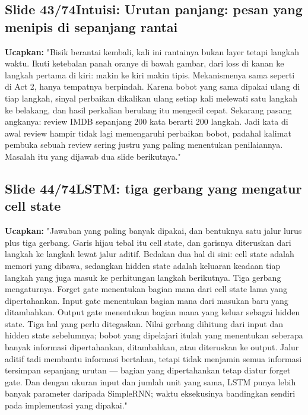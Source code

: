 \documentclass[11pt]{article}
\renewcommand{\framebox}[1]{\colorbox{acc!15}{\textcolor{acc}{\textbf{#1}}}}
\begin{document}
\subsection*{\framebox{Slide 43/74}\quad Intuisi: Urutan panjang: pesan yang menipis di sepanjang rantai}
\textbf{Ucapkan:} "Bisik berantai kembali, kali ini rantainya bukan layer tetapi langkah waktu. Ikuti ketebalan panah oranye di bawah gambar, dari loss di kanan ke langkah pertama di kiri: makin ke kiri makin tipis. Mekanismenya sama seperti di Act 2, hanya tempatnya berpindah. Karena bobot yang sama dipakai ulang di tiap langkah, sinyal perbaikan dikalikan ulang setiap kali melewati satu langkah ke belakang, dan hasil perkalian berulang itu mengecil cepat. Sekarang pasang angkanya: review IMDB sepanjang 200 kata berarti 200 langkah. Jadi kata di awal review hampir tidak lagi memengaruhi perbaikan bobot, padahal kalimat pembuka sebuah review sering justru yang paling menentukan penilaiannya. Masalah itu yang dijawab dua slide berikutnya."\\[2pt]

\subsection*{\framebox{Slide 44/74}\quad LSTM: tiga gerbang yang mengatur cell state}
\textbf{Ucapkan:} "Jawaban yang paling banyak dipakai, dan bentuknya satu jalur lurus plus tiga gerbang. Garis hijau tebal itu cell state, dan garisnya diteruskan dari langkah ke langkah lewat jalur aditif. Bedakan dua hal di sini: cell state adalah memori yang dibawa, sedangkan hidden state adalah keluaran keadaan tiap langkah yang juga masuk ke perhitungan langkah berikutnya. Tiga gerbang mengaturnya. Forget gate menentukan bagian mana dari cell state lama yang dipertahankan. Input gate menentukan bagian mana dari masukan baru yang ditambahkan. Output gate menentukan bagian mana yang keluar sebagai hidden state. Tiga hal yang perlu ditegaskan. Nilai gerbang dihitung dari input dan hidden state sebelumnya; bobot yang dipelajari itulah yang menentukan seberapa banyak informasi dipertahankan, ditambahkan, atau diteruskan ke output. Jalur aditif tadi membantu informasi bertahan, tetapi tidak menjamin semua informasi tersimpan sepanjang urutan --- bagian yang dipertahankan tetap diatur forget gate. Dan dengan ukuran input dan jumlah unit yang sama, LSTM punya lebih banyak parameter daripada SimpleRNN; waktu eksekusinya bandingkan sendiri pada implementasi yang dipakai."\\[2pt]
\end{document}
